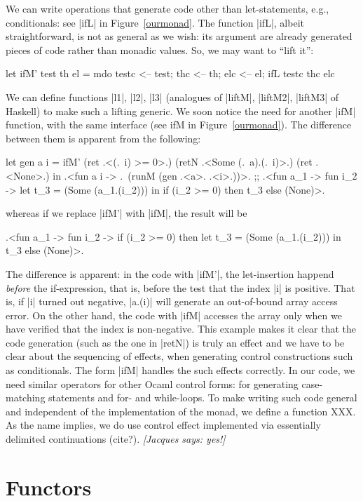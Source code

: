 \documentclass{llncs}
\newcommand{\jacques}[1]{{\it [Jacques says: #1]}}
\begin{document}
We can write operations that generate code other than let-statements,
e.g., conditionals: see |ifL| in Figure~\ref{ourmonad}. The function |ifL|, 
albeit straightforward, is not as general as we wish: its argument are
already generated pieces of code rather than monadic values. So, we
may want to ``lift it'':
\begin{code}
let ifM' test th el = mdo {
  testc <-- test;
  thc   <-- th;
  elc   <-- el;
  ifL testc thc elc}
\end{code}

\noindent We can define functions |l1|, |l2|, |l3| (analogues of |liftM|,
|liftM2|, |liftM3| of Haskell) to make such a lifting generic.
We soon notice the need for another |ifM| function, with the same
interface (see ifM in Figure~\ref{ourmonad}). The difference between them is
apparent from the following:
\begin{code}
let gen a i = ifM' (ret .<(.~i) >= 0>.) (retN .<Some (.~a).(.~i)>.)
                           (ret .<None>.)
 in .<fun a i -> .~(runM (gen .<a>. .<i>.))>.
;;
.<fun a_1 -> fun i_2 ->
    let t_3 = (Some (a_1.(i_2))) in if (i_2 >= 0) then t_3 else (None)>.
\end{code}
\noindent whereas if we replace |ifM'| with |ifM|, the result will be
\begin{code}
.<fun a_1 -> fun i_2 ->
    if (i_2 >= 0) then let t_3 = (Some (a_1.(i_2))) in t_3 else (None)>.
\end{code}

The difference is apparent: in the code with |ifM'|, the let-insertion
happend \emph{before} the if-expression, that is, before the test that
the index |i| is positive. That is, if |i| turned out
negative, |a.(i)| will generate an out-of-bound array access
error. On the other hand, the code with |ifM| accesses the array only
when we have verified that the index is non-negative. This example
makes it clear that the code generation (such as the one in |retN|) is 
truly an effect and we have to be clear about the sequencing of
effects, when generating control constructions such as conditionals.
The form |ifM| handles the such effects correctly. In our code, we
need similar operators for other Ocaml control forms: for generating
case-matching statements and for- and while-loops. To make writing
such code general and independent of the implementation of the monad,
we define a function XXX. As the name implies, we do use control
effect implemented via essentially delimited continuations (cite?).
\jacques{yes!}

\section{Functors}\label{functors}
\end{document}
